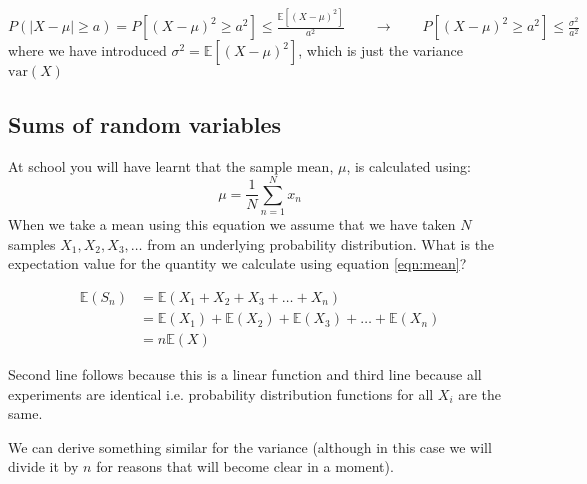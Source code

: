 \documentclass[paper=a4, fontsize=11pt]{scrartcl}
\newcommand{\red}[1]{{\color{red}#1}}
\numberwithin{equation}{section}
\numberwithin{figure}{section}
\numberwithin{table}{section}
\begin{document}
\begin{answers}
\vspace{0.25cm}
\red{ 
$P(|X - \mu | \ge a) = P[ (X-\mu)^2 \ge a^2] \le
\frac{\mathbb{E}[(X-\mu)^2]}{a^2} 
\qquad  \rightarrow \qquad P[ (X-\mu)^2 \ge a^2] \le \frac{\sigma^2}{a^2}$ \\

where we have introduced $\sigma^2=\mathbb{E}[(X-\mu)^2]$, which is just the
variance $\textrm{var}(X)$
}
\end{answers}

\subsection{Sums of random variables}

At school you will have learnt that the sample mean, $\mu$, is calculated using:
%
\begin{equation}
 \mu = \frac{1}{N} \sum_{n=1}^N x_n 
 \label{eqn:mean}
\end{equation}
%
When we take a mean using this equation we assume that we have taken $N$ samples
$X_1, X_2, X_3, \dots$ from an underlying probability distribution.  What is the
expectation value for the quantity we calculate using
equation \ref{eqn:mean}? 

\begin{questions}
\vspace{3cm}
\end{questions}

\begin{answers}
\red{
\begin{equation}
\begin{aligned}
\mathbb{E}(S_n) & = \mathbb{E}(X_1 + X_2 + X_3 + \dots + X_n ) \\
 & = \mathbb{E}(X_1) + \mathbb{E}(X_2) + \mathbb{E}(X_3) + \dots +
\mathbb{E}(X_n ) \\
 & = n \mathbb{E}(X)
\end{aligned}
\end{equation}

Second line follows because this is a linear function and third line because all
experiments 
are identical i.e. probability distribution functions for all $X_i$ are the
same.
\vspace{0.25cm}
}
\end{answers}

\noindent We can derive something similar for the variance (although in this
case we will divide it by $n$ for reasons that will become clear in a moment).
\end{document}
